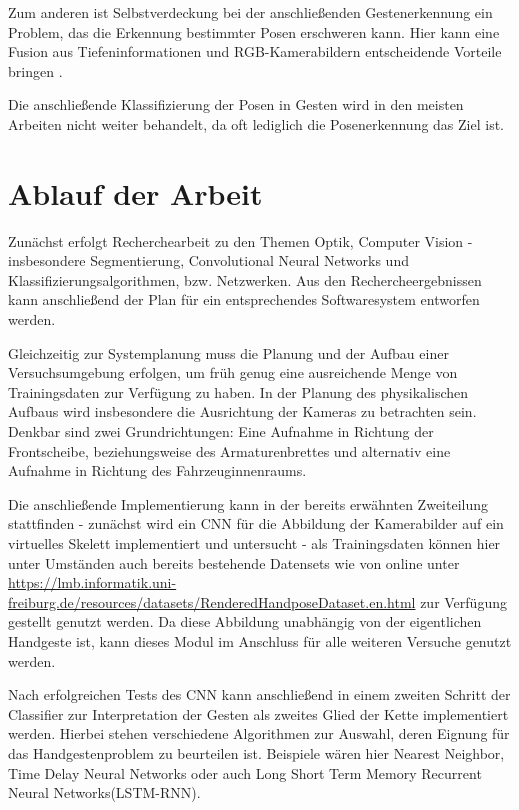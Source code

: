 \documentclass[12pt, a4paper]{book}
\begin{document}
Zum anderen ist Selbstverdeckung bei der anschließenden Gestenerkennung ein Problem, das die Erkennung bestimmter Posen erschweren kann. Hier kann eine Fusion aus Tiefeninformationen und RGB-Kamerabildern entscheidende Vorteile bringen \cite{Keskin2012}.

Die anschließende Klassifizierung der Posen in Gesten wird in den meisten Arbeiten nicht weiter behandelt, da oft lediglich die Posenerkennung das Ziel ist.

\section{Ablauf der Arbeit}
Zunächst erfolgt Recherchearbeit zu den Themen Optik, Computer Vision - insbesondere Segmentierung, Convolutional Neural Networks und Klassifizierungsalgorithmen, bzw. Netzwerken. Aus den Rechercheergebnissen kann anschließend der Plan für ein entsprechendes Softwaresystem entworfen werden.

Gleichzeitig zur Systemplanung muss die Planung und der Aufbau einer Versuchsumgebung erfolgen, um früh genug eine ausreichende Menge von Trainingsdaten zur Verfügung zu haben.
In der Planung des physikalischen Aufbaus wird insbesondere die Ausrichtung der Kameras zu betrachten sein. Denkbar sind zwei Grundrichtungen: Eine Aufnahme in Richtung der Frontscheibe, beziehungsweise des Armaturenbrettes und alternativ eine Aufnahme in Richtung des Fahrzeuginnenraums. 

Die anschließende Implementierung kann in der bereits erwähnten Zweiteilung stattfinden - zunächst wird ein CNN für die Abbildung der Kamerabilder auf ein virtuelles Skelett implementiert und untersucht - als Trainingsdaten können hier unter Umständen auch bereits bestehende Datensets wie von \cite{Zimmermann03.05.2017} online unter \url{https://lmb.informatik.uni-freiburg.de/resources/datasets/RenderedHandposeDataset.en.html} zur Verfügung gestellt genutzt werden. Da diese Abbildung unabhängig von der eigentlichen Handgeste ist, kann dieses Modul im Anschluss für alle weiteren Versuche genutzt werden. 

Nach erfolgreichen Tests des CNN kann anschließend in einem zweiten Schritt der Classifier zur Interpretation der Gesten als zweites Glied der Kette implementiert werden. Hierbei stehen verschiedene Algorithmen zur Auswahl, deren Eignung für das Handgestenproblem zu beurteilen ist. Beispiele wären hier Nearest Neighbor, Time Delay Neural Networks oder auch Long Short Term Memory Recurrent Neural Networks(LSTM-RNN).
\end{document}
